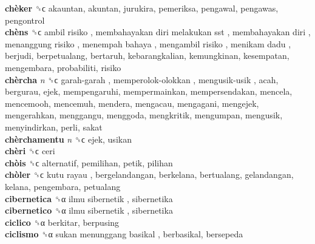 \textbf{chèker} ␝ϲ  akauntan, akuntan, jurukira, pemeriksa, pengawal, pengawas, pengontrol  \\
\textbf{chèns} ␝ϲ   ambil risiko ,  membahayakan diri melakukan sst ,  membahayakan diri ,  menanggung risiko ,  menempah bahaya ,  mengambil risiko ,  menikam dadu , berjudi, berpetualang, bertaruh, kebarangkalian, kemungkinan, kesempatan, mengembara, probabiliti, risiko  \\
\textbf{chèrcha} \emph{n}  ␝ϲ   garah-garah ,  memperolok-olokkan ,  mengusik-usik , acah, bergurau, ejek, mempengaruhi, mempermainkan, mempersendakan, mencela, mencemooh, mencemuh, mendera, mengacau, mengagani, mengejek, mengerahkan, menggangu, menggoda, mengkritik, mengumpan, mengusik, menyindirkan, perli, sakat  \\
\textbf{chèrchamentu} \emph{n}  ␝ϲ  ejek, usikan  \\
\textbf{chèri} ␝ϲ  ceri  \\
\textbf{chòis} ␝ϲ  alternatif, pemilihan, petik, pilihan  \\
\textbf{chòler} ␝ϲ   kutu rayau , bergelandangan, berkelana, bertualang, gelandangan, kelana, pengembara, petualang  \\
\textbf{cibernetica} ␝α   ilmu sibernetik , sibernetika  \\
\textbf{cibernetico} ␝α   ilmu sibernetik , sibernetika  \\
\textbf{ciclico} ␝α  berkitar, berpusing  \\
\textbf{ciclismo} ␝α   sukan menunggang basikal , berbasikal, bersepeda  \\
